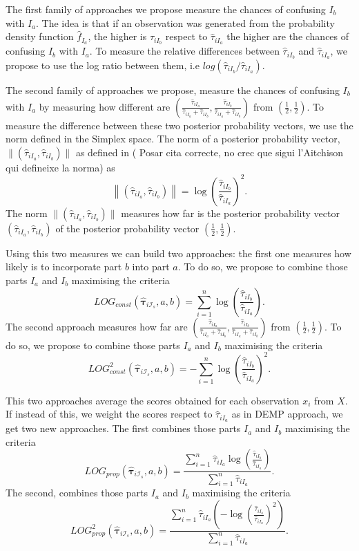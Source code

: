 \documentclass[10pt, a4paper]{article}
\newcommand{\m}[1]{\boldsymbol{#1}}
\begin{document}
The first family of approaches we propose measure the chances of confusing $I_b$ with $I_a$. The idea is that if an observation was generated from the probability density function $\hat{f}_{I_a}$, the higher is $\hat{\tau}_{iI_b}$ respect to $\hat{\tau}_{iI_a}$ the higher are the chances of confusing $I_b$ with $I_a$. To measure the relative differences between  $\hat{\tau}_{iI_b}$ and $\hat{\tau}_{iI_a}$, we propose to use the log ratio between them, i.e $log( \hat{\tau}_{iI_b}/\hat{\tau}_{iI_a})$.

The second family of approaches we propose, measure the chances of confusing $I_b$ with $I_a$  by measuring how different are $(\frac{\hat{\tau}_{iI_a}}{\hat{\tau}_{iI_a} + \hat{\tau}_{iI_b}}, \frac{\hat{\tau}_{iI_b}}{\hat{\tau}_{iI_a} + \hat{\tau}_{iI_b}})$ from $(\frac{1}{2}, \frac{1}{2})$. To measure the difference between these two posterior probability vectors, we use the norm defined in the Simplex space. The norm of a posterior probability vector, $\| (\hat{\tau}_{iI_a}, \hat{\tau}_{iI_b}) \|$  as defined in ({\color{red} Posar cita correcte, no crec que sigui l'Aitchison qui defineixe la norma}) \citep{aitchison1986statistical} as
\[
\left\| (\hat{\tau}_{iI_a}, \hat{\tau}_{iI_b}) \right\| = \log (\frac{ \hat{\tau}_{iI_b} }{ \hat{\tau}_{iI_a} })^2.
\]
The norm $\| (\hat{\tau}_{iI_a}, \hat{\tau}_{iI_b}) \|$ measures how far is the posterior probability vector $(\hat{\tau}_{iI_a}, \hat{\tau}_{iI_b})$ of the posterior probability vector $(\frac{1}{2}, \frac{1}{2})$.

Using this two measures we can build two approaches: the first one measures how likely is to incorporate part $b$ into part $a$. To do so, we propose to combine those parts $I_a$ and $I_b$ maximising the criteria
\[
LOG_{const}( \hat{\m \tau}_{i \mathcal{I}_s}, a, b) = \sum_{i=1}^n \log (\frac{ \hat{\tau}_{iI_b} }{ \hat{\tau}_{iI_a} }).
\]
The second approach measures how far are $(\frac{\hat{\tau}_{iI_a}}{\hat{\tau}_{iI_a} + \hat{\tau}_{iI_b}}, \frac{\hat{\tau}_{iI_b}}{\hat{\tau}_{iI_a} + \hat{\tau}_{iI_b}})$ from $(\frac{1}{2}, \frac{1}{2})$. To do so, we propose to combine those parts $I_a$ and $I_b$ maximising the criteria
\[
LOG^2_{const}( \hat{\m \tau}_{i \mathcal{I}_s}, a, b) = -\sum_{i=1}^n \log (\frac{ \hat{\tau}_{iI_b} }{ \hat{\tau}_{iI_a} })^2.
\]

This two approaches average the scores obtained for each observation $x_i$ from $X$. If instead of this, we weight the scores respect to $ \hat{\tau}_{iI_a}$  as in DEMP approach, we get two new approaches. The first combines those parts $I_a$ and $I_b$ maximising the criteria
\[
LOG_{prop}( \hat{\m \tau}_{i \mathcal{I}_s}, a, b) = \frac{ \sum_{i=1}^n \hat{\tau}_{iI_a} \log (\frac{ \hat{\tau}_{iI_b} }{ \hat{\tau}_{iI_a} })}{\sum_{i=1}^n\hat{\tau}_{iI_a}}.
\]
The second, combines those parts $I_a$ and $I_b$ maximising the criteria
\[
LOG^2_{prop}( \hat{\m \tau}_{i \mathcal{I}_s}, a, b) = \frac{ \sum_{i=1}^n \hat{\tau}_{iI_a} (-\log (\frac{ \hat{\tau}_{iI_b} }{ \hat{\tau}_{iI_a} })^2)}{\sum_{i=1}^n\hat{\tau}_{iI_a}}.
\]
\end{document}
